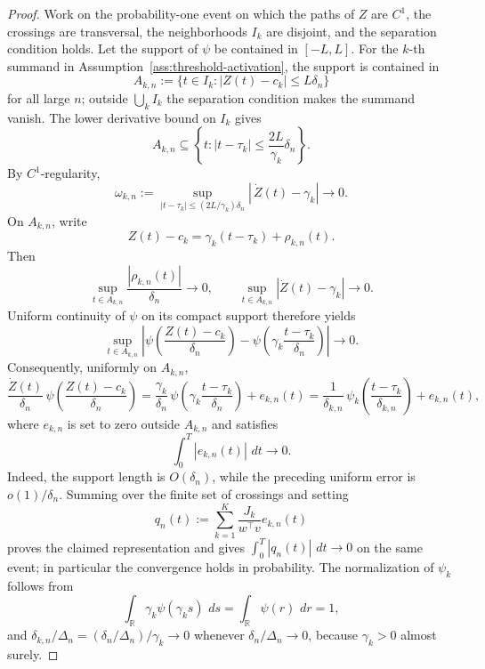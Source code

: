 \documentclass[11pt,a4paper]{amsart}
\theoremstyle{plain}
\theoremstyle{definition}
\theoremstyle{remark}
\newcommand{\R}{\mathbb{R}}
\newcommand{\dd}{\,d}
\begin{document}
\begin{proof}
Work on the probability-one event on which the paths of \(Z\) are \(C^1\), the crossings are
transversal, the neighborhoods \(I_k\) are disjoint, and the separation condition holds.  Let the
support of \(\psi\) be contained in \([-L,L]\).  For the \(k\)-th summand in
Assumption~\ref{ass:threshold-activation}, the support is contained in
\[
        A_{k,n}:=\{t\in I_k: |Z(t)-c_k|\le L\delta_n\}
\]
for all large \(n\); outside \(\bigcup_k I_k\) the separation condition makes the summand vanish.
The lower derivative bound on \(I_k\) gives
\[
        A_{k,n}\subseteq
        \left\{t: |t-\tau_k|\le \frac{2L}{\gamma_k}\delta_n\right\}.
\]
By \(C^1\)-regularity,
\[
        \omega_{k,n}:=
        \sup_{|t-\tau_k|\le (2L/\gamma_k)\delta_n}|\,\dot Z(t)-\gamma_k|\longrightarrow0.
\]
On \(A_{k,n}\), write
\[
        Z(t)-c_k
        =
        \gamma_k(t-\tau_k)+\rho_{k,n}(t).
\]
Then
\[
        \sup_{t\in A_{k,n}}\frac{|\rho_{k,n}(t)|}{\delta_n}\to0,
        \qquad
        \sup_{t\in A_{k,n}}|\dot Z(t)-\gamma_k|\to0.
\]
Uniform continuity of \(\psi\) on its compact support therefore yields
\[
        \sup_{t\in A_{k,n}}
        \left|
        \psi\!\left(\frac{Z(t)-c_k}{\delta_n}\right)
        -
        \psi\!\left(\gamma_k\frac{t-\tau_k}{\delta_n}\right)
        \right|\to0.
\]
Consequently, uniformly on \(A_{k,n}\),
\[
        \frac{\dot Z(t)}{\delta_n}\,
        \psi\!\left(\frac{Z(t)-c_k}{\delta_n}\right)
        =
        \frac{\gamma_k}{\delta_n}\,
        \psi\!\left(\gamma_k\frac{t-\tau_k}{\delta_n}\right)
        +
        e_{k,n}(t)
        =
        \frac{1}{\delta_{k,n}}\,
        \psi_k\!\left(\frac{t-\tau_k}{\delta_{k,n}}\right)
        +
        e_{k,n}(t),
\]
where \(e_{k,n}\) is set to zero outside \(A_{k,n}\) and satisfies
\[
        \int_0^T |e_{k,n}(t)|\,\dd t\to0.
\]
Indeed, the support length is \(O(\delta_n)\), while the preceding uniform error is
\(o(1)/\delta_n\).  Summing over the finite set of crossings and setting
\[
        q_n(t):=\sum_{k=1}^K \frac{J_k}{w^\top v} e_{k,n}(t)
\]
proves the claimed representation and gives \(\int_0^T|q_n(t)|\,\dd t\to0\) on the same event;
in particular the convergence holds in probability.  The normalization of \(\psi_k\) follows from
\[
        \int_{\R}\gamma_k\psi(\gamma_k s)\,\dd s
        =
        \int_{\R}\psi(r)\,\dd r
        =1,
\]
and
\(\delta_{k,n}/\Delta_n=(\delta_n/\Delta_n)/\gamma_k\to0\) whenever
\(\delta_n/\Delta_n\to0\), because \(\gamma_k>0\) almost surely.
\end{proof}
\end{document}
